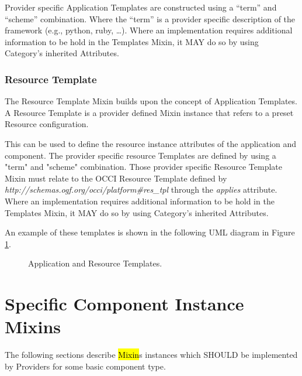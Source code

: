 \documentclass[10pt,a4paper]{article}
\begin{document}
Provider specific Application Templates are constructed using a “term” and “scheme” combination. Where the “term” is a provider specific description of the framework (e.g., python, ruby, …). Where an implementation requires additional information to be hold in the Templates Mixin, it MAY do so by using Category’s inherited Attributes.

\subsubsection{Resource Template}
The Resource Template Mixin builds upon the concept of Application Templates. A Resource Template is a provider defined Mixin instance that refers to a preset Resource configuration.

This can be used to define the resource instance attributes of the application and component. The provider specific resource Templates are defined by using a "term" and "scheme" combination. Those provider specific Resource Template Mixin must relate to the OCCI Resource Template defined by \textit{http://schemas.ogf.org/occi/platform\#res\_tpl} through the \textit{applies} attribute. Where an implementation requires additional information to be hold in the Templates Mixin, it MAY do so by using Category’s inherited Attributes.

An example of these templates is shown in the following UML diagram in Figure \ref{fig:templates}.

\begin{figure}[!h]
	{\centering {} \par}
	\caption{Application and Resource Templates.}
	\label{fig:templates}
\end{figure}

\section{Specific Component Instance Mixins}
The following sections describe \hl{Mixin}s instances which SHOULD be implemented by Providers for some basic component type.
\end{document}
